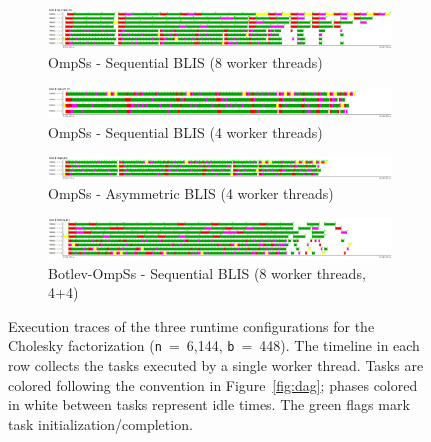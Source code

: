 \begin{figure}%
\centering
	\begin{subfigure}{\textwidth}
   \includegraphics[width=\textwidth]{Plots/Traces/sym_8cores_tasks.png}
		\caption{OmpSs - Sequential BLIS (8 worker threads)} 
	\end{subfigure}
	\begin{subfigure}{\textwidth}
   \includegraphics[width=\textwidth]{Plots/Traces/sym_tasks.png}
 \caption{OmpSs - Sequential BLIS (4 worker threads)} 
	\end{subfigure}
	\begin{subfigure}{\textwidth}
   \includegraphics[width=\textwidth]{Plots/Traces/asym_tasks.png}
		\caption{OmpSs - Asymmetric BLIS (4 worker threads)}
	\end{subfigure}
	\begin{subfigure}{\textwidth}
   \includegraphics[width=\textwidth]{Plots/Traces/botlev_tasks.png}
		\caption{Botlev-OmpSs - Sequential BLIS (8 worker threads, 4+4)}
	\end{subfigure}
\caption{Execution traces of the three runtime configurations for the Cholesky factorization ({\tt n}~=~6,144, 
{\tt b}~=~448). 
The timeline in each row collects the tasks executed by a single worker thread. 
Tasks are colored following the convention in Figure~\ref{fig:dag};
phases colored in white between tasks represent idle times.
The green flags mark task initialization/completion. 
}
\label{fig:traces_tasks}
\end{figure}

